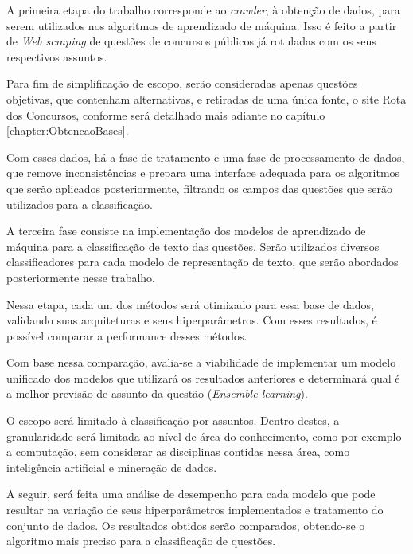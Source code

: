 A primeira etapa do trabalho corresponde ao \textit{crawler}, à obtenção de dados, para serem utilizados nos algoritmos de aprendizado de máquina. Isso é feito a partir de \textit{Web scraping} de questões de concursos públicos já rotuladas com os seus respectivos assuntos.

Para fim de simplificação de escopo, serão consideradas apenas questões objetivas, que contenham alternativas, e retiradas de uma única fonte, o site Rota dos Concursos, conforme será detalhado mais adiante no capítulo \ref{chapter:ObtencaoBases}.

Com esses dados, há a fase de tratamento e uma fase de processamento de dados, que remove inconsistências e prepara uma interface adequada para os algoritmos que serão aplicados posteriormente, filtrando os campos das questões que serão utilizados para a classificação.

A terceira fase consiste na implementação dos modelos de aprendizado de máquina para a classificação de texto das questões. Serão utilizados diversos classificadores para cada modelo de representação de texto, que serão abordados posteriormente nesse trabalho.

Nessa etapa, cada um dos métodos será otimizado para essa base de dados, validando suas arquiteturas e seus hiperparâmetros. Com esses resultados, é possível comparar a performance desses métodos.

Com base nessa comparação, avalia-se a viabilidade de implementar um modelo unificado dos modelos que utilizará os resultados anteriores e determinará qual é a melhor previsão de assunto da questão (\textit{Ensemble learning}).

O escopo será limitado à classificação por assuntos. Dentro destes, a granularidade será limitada ao nível de área do conhecimento, como por exemplo a computação, sem considerar as disciplinas contidas nessa área, como inteligência artificial e mineração de dados.

A seguir, será feita uma análise de desempenho para cada modelo que pode resultar na variação de seus hiperparâmetros implementados e tratamento do conjunto de dados. Os resultados obtidos serão comparados, obtendo-se o algoritmo mais preciso para a classificação de questões.

